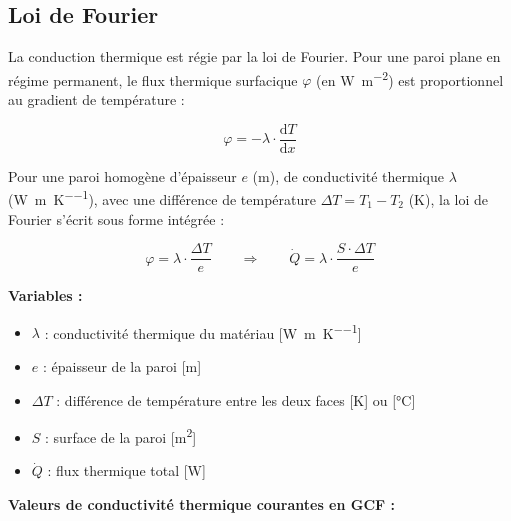 \subsection{Loi de Fourier}

La conduction thermique est régie par la loi de Fourier. Pour une paroi plane en régime
permanent, le flux thermique surfacique \(\varphi\) (en \si{\watt\per\meter\squared}) est
proportionnel au gradient de température :

\begin{equation}
  \varphi = -\lambda \cdot \frac{\mathrm{d}T}{\mathrm{d}x}
  \label{eq:fourier_diff}
\end{equation}

Pour une paroi homogène d'épaisseur \(e\) (\si{\meter}), de conductivité thermique
\(\lambda\) (\si{\watt\per\meter\per\kelvin}), avec une différence de température
\(\Delta T = T_1 - T_2\) (\si{\kelvin}), la loi de Fourier s'écrit sous forme intégrée :

\begin{equation}
  \varphi = \lambda \cdot \frac{\Delta T}{e}
  \qquad \Rightarrow \qquad
  \dot{Q} = \lambda \cdot \frac{S \cdot \Delta T}{e}
  \label{eq:fourier_integre}
\end{equation}

\textbf{Variables :}
\begin{itemize}
  \item \(\lambda\) : conductivité thermique du matériau [\si{\watt\per\meter\per\kelvin}]
  \item \(e\) : épaisseur de la paroi [\si{\meter}]
  \item \(\Delta T\) : différence de température entre les deux faces [\si{\kelvin}] ou
        [\si{\degreeCelsius}]
  \item \(S\) : surface de la paroi [\si{\meter\squared}]
  \item \(\dot{Q}\) : flux thermique total [\si{\watt}]
\end{itemize}

\textbf{Valeurs de conductivité thermique courantes en GCF :}

